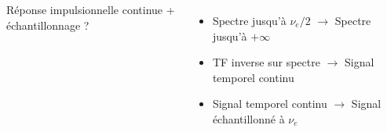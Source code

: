 \documentclass{beamer}
\begin{document}
\begin{frame}
\begin{columns}
\begin{center}
\end{center}

\column{60mm}
Réponse impulsionnelle continue + échantillonnage ? \\
\vspace{0.1cm}
\begin{itemize}
\item<2-> Spectre jusqu'à $\nu_e/2$ $\rightarrow$ Spectre jusqu'à $+ \infty$
\vspace{0.1cm}
\item<3-> TF inverse sur spectre $\rightarrow$ Signal temporel continu 
\vspace{0.1cm}
\item<4-> Signal temporel continu  $\rightarrow$ Signal échantillonné à $\nu_e$
\vspace{0.1cm}
\end{itemize}

\end{columns}
\end{frame}
\end{document}
